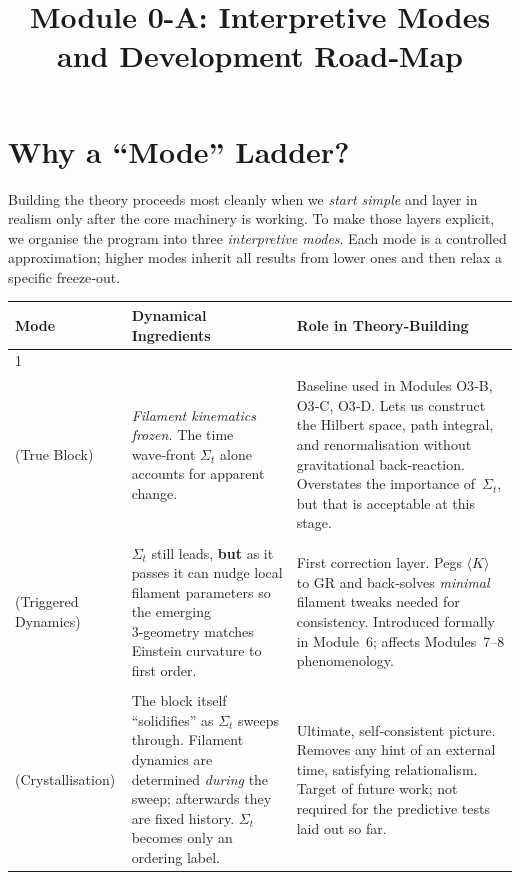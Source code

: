 \documentclass[12pt]{article}
\title{Module 0-A: Interpretive Modes and Development Road‑Map}
\author{}
\date{}
\begin{document}
\maketitle

\section*{Why a ``Mode'' Ladder?}
Building the theory proceeds most cleanly when we \emph{start simple} and layer in realism only after the core machinery
is working.  To make those layers explicit, we organise the program into three
\emph{interpretive modes}.  Each mode is a controlled approximation; higher modes inherit all results
from lower ones and then relax a specific freeze‑out.

\begin{center}
\renewcommand{\arraystretch}{1.2}
\begin{tabular}{@{}p{2cm}p{4.5cm}p{5.5cm}@{}}
\toprule
\textbf{Mode} & \textbf{Dynamical Ingredients} & \textbf{Role in Theory‑Building} \\
\midrule
1 \\ (True Block) &
\emph{Filament kinematics frozen.}  The time wave‑front $\Sigma_t$ alone accounts for apparent change. &
Baseline used in Modules O3‑B, O3‑C, O3‑D.  Lets us construct the Hilbert space, path integral, and renormalisation without gravitational back‑reaction.  Overstates the importance of~$\Sigma_t$, but that is acceptable at this stage. \\
\addlinespace
2 \\ (Triggered Dynamics) &
$\Sigma_t$ still leads, \textbf{but} as it passes it can nudge local filament parameters so the emerging 3‑geometry matches Einstein curvature to first order. &
First correction layer.  Pegs $\langle K\rangle$ to GR and back‑solves \emph{minimal} filament tweaks needed for consistency.  Introduced formally in Module~6; affects Modules~7–8 phenomenology. \\
\addlinespace
3 \\ (Crystallisation) &
The block itself ``solidifies'' as $\Sigma_t$ sweeps through.  Filament dynamics are determined \emph{during} the sweep; afterwards they are fixed history.  $\Sigma_t$ becomes only an ordering label. &
Ultimate, self‑consistent picture.  Removes any hint of an external time, satisfying relationalism.  Target of future work; not required for the predictive tests laid out so far. \\
\bottomrule
\end{tabular}
\end{center}
\end{document}

